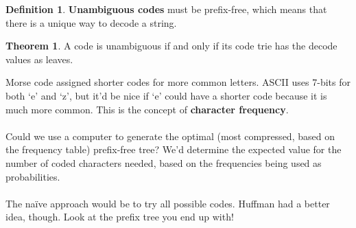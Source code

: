 \documentclass[]{article}
\theoremstyle{definition}
\newtheorem*{defn}{Definition}
\newtheorem*{theorem}{Theorem}
\begin{document}
				\begin{defn}
					\textbf{Unambiguous codes} must be prefix-free, which means that there is a unique way to decode a string.
				\end{defn}

				\begin{theorem}
					A code is unambiguous if and only if its code trie has the decode values as leaves.
				\end{theorem}

				Morse code assigned shorter codes for more common letters. ASCII uses 7-bits for both `e' and `z', but it'd be nice if `e' could have a shorter code because it is much more common. This is the concept of \textbf{character frequency}.
				\\ \\
				Could we use a computer to generate the optimal (most compressed, based on the frequency table) prefix-free tree? We'd determine the expected value for the number of coded characters needed, based on the frequencies being used as probabilities.
				\\ \\
				The na\"ive approach would be to try all possible codes. Huffman had a better idea, though. Look at the prefix tree you end up with!
\end{document}
